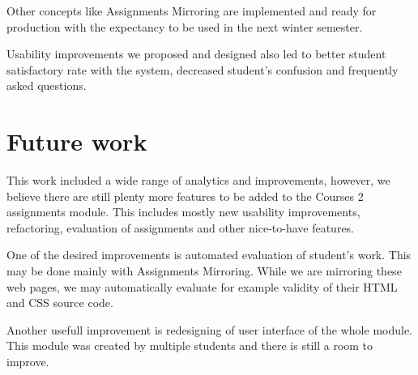 Other concepts like Assignments Mirroring are implemented and ready for production with the expectancy to be used in the next winter semester.

Usability improvements we proposed and designed also led to better student satisfactory rate with the system, decreased student's confusion and frequently asked questions.

\section*{Future work}
This  work included a wide range of analytics and improvements, however, we believe there are still plenty more features to be added to the Courses 2 assignments module. This includes mostly new usability improvements, refactoring, evaluation of assignments and other nice-to-have features.

One of the desired improvements is automated evaluation of student's work. This may be done mainly with Assignments Mirroring. While we are mirroring these web pages, we may automatically evaluate for example validity of their HTML and CSS source code.

Another usefull improvement is redesigning of user interface of the whole module. This module was created by multiple students and there is still a room to improve.